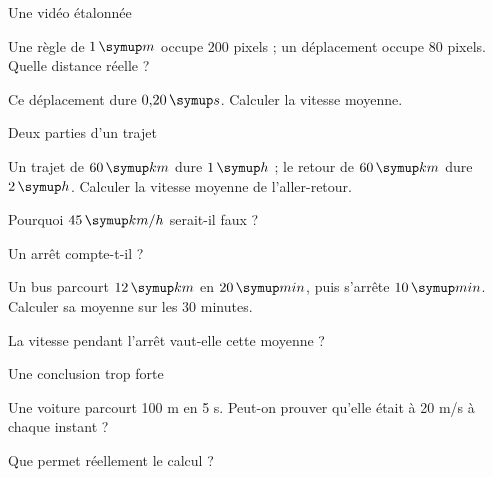\par\noindent\begin{minipage}{\linewidth}
\begin{exercice}[2]{Une vidéo étalonnée}
\begin{questions}
\item Une règle de $1\unite m$ occupe $200$ pixels ; un déplacement occupe $80$ pixels. Quelle distance réelle ?
\item Ce déplacement dure $0{,}20\unite s$. Calculer la vitesse moyenne.
\end{questions}
\end{exercice}
\end{minipage}
\clearpage{}
\par\noindent\begin{minipage}{\linewidth}
\begin{exercice}[3]{Deux parties d’un trajet}
\begin{questions}
\item Un trajet de $60\unite{km}$ dure $1\unite h$ ; le retour de $60\unite{km}$ dure $2\unite h$. Calculer la vitesse moyenne de l’aller-retour.
\item Pourquoi $45\unite{km/h}$ serait-il faux ?
\end{questions}
\end{exercice}
\end{minipage}
\par\noindent\begin{minipage}{\linewidth}
\begin{exercice}[3]{Un arrêt compte-t-il ?}
\begin{questions}
\item Un bus parcourt $12\unite{km}$ en $20\unite{min}$, puis s’arrête $10\unite{min}$. Calculer sa moyenne sur les 30 minutes.
\item La vitesse pendant l’arrêt vaut-elle cette moyenne ?
\end{questions}
\end{exercice}
\end{minipage}
\par\noindent\begin{minipage}{\linewidth}
\begin{exercice}[3]{Une conclusion trop forte}
\begin{questions}
\item Une voiture parcourt 100 m en 5 s. Peut-on prouver qu’elle était à 20 m/s à chaque instant ?
\item Que permet réellement le calcul ?
\end{questions}
\end{exercice}
\end{minipage}
